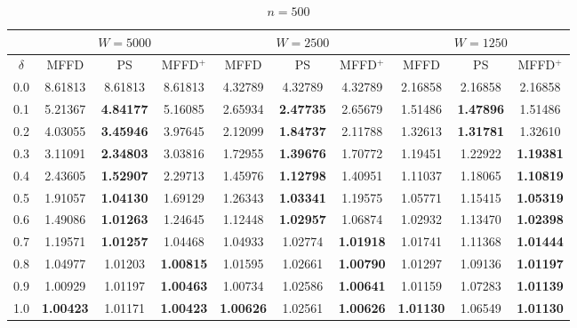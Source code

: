 \documentclass[oribibl]{llncs}
\begin{document}
\begin{table}[!htb]
	\centering
	\caption{$n = 500$}
	\begin{tabular}{c@{\hspace{15pt}}c@{\hspace{10pt}}c@{\hspace{10pt}}c@{\hspace{7pt}}| @{\hspace{7pt}}c@{\hspace{10pt}}c@{\hspace{10pt}}c@{\hspace{7pt}}| @{\hspace{7pt}} c@{\hspace{10pt}}c@{\hspace{10pt}}c}
		\noalign{\smallskip}
		& \multicolumn{3}{c}{$W = 5000$} & \multicolumn{3}{c}{$W = 2500$} & \multicolumn{3}{c}{$W = 1250$} \\
		\hline\noalign{\smallskip}
		$\delta$ & MFFD & PS & MFFD$^+$ & MFFD & PS & MFFD$^+$ & MFFD & PS & MFFD$^+$ \\
		\noalign{\smallskip}
		\hline
		\noalign{\smallskip}
		0.0 & 8.61813 & 8.61813 & 8.61813 & 4.32789 & 4.32789 & 4.32789 & 2.16858 & 2.16858 & 2.16858 \\
		0.1 & 5.21367 & \textbf{4.84177} & 5.16085 & 2.65934 & \textbf{2.47735} & 2.65679 & 1.51486 & \textbf{1.47896} & 1.51486 \\
		0.2 & 4.03055 & \textbf{3.45946} & 3.97645 & 2.12099 & \textbf{1.84737} & 2.11788 & 1.32613 & \textbf{1.31781} & 1.32610 \\
		0.3 & 3.11091 & \textbf{2.34803} & 3.03816 & 1.72955 & \textbf{1.39676} & 1.70772 & 1.19451 & 1.22922 & \textbf{1.19381} \\
		0.4 & 2.43605 & \textbf{1.52907} & 2.29713 & 1.45976 & \textbf{1.12798} & 1.40951 & 1.11037 & 1.18065 & \textbf{1.10819} \\
		0.5 & 1.91057 & \textbf{1.04130} & 1.69129 & 1.26343 & \textbf{1.03341} & 1.19575 & 1.05771 & 1.15415 & \textbf{1.05319} \\
		0.6 & 1.49086 & \textbf{1.01263} & 1.24645 & 1.12448 & \textbf{1.02957} & 1.06874 & 1.02932 & 1.13470 & \textbf{1.02398} \\
		0.7 & 1.19571 & \textbf{1.01257} & 1.04468 & 1.04933 & 1.02774 & \textbf{1.01918} & 1.01741 & 1.11368 & \textbf{1.01444} \\
		0.8 & 1.04977 & 1.01203 & \textbf{1.00815} & 1.01595 & 1.02661 & \textbf{1.00790} & 1.01297 & 1.09136 & \textbf{1.01197} \\
		0.9 & 1.00929 & 1.01197 & \textbf{1.00463} & 1.00734 & 1.02586 & \textbf{1.00641} & 1.01159 & 1.07283 & \textbf{1.01139} \\
		1.0 & \textbf{1.00423} & 1.01171 & \textbf{1.00423} & \textbf{1.00626} & 1.02561 & \textbf{1.00626} & \textbf{1.01130} & 1.06549 & \textbf{1.01130} \\		
		\hline
	\end{tabular}
	\label{table:n500}
\end{table}	
\end{document}
